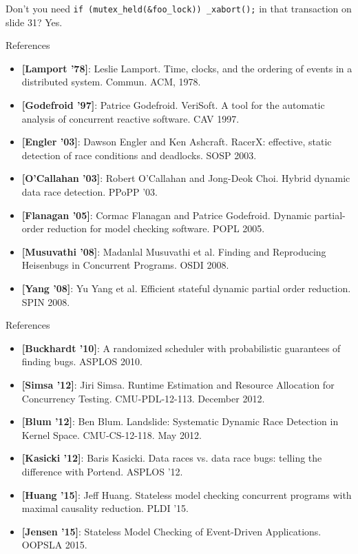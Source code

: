 \documentclass[xcolor=dvipsnames]{beamer}
\begin{document}
\begin{frame}{Don't you need \texttt{if (mutex\_held(\&foo\_lock)) \_xabort();} in that transaction on slide 31?}
	Yes.
\end{frame}

\begin{frame}{References}
	\small
	\begin{itemize}
		\item {\bf [Lamport '78]}:
			Leslie Lamport. Time, clocks, and the ordering of events in a distributed system.
			Commun. ACM, 1978.
		\item {\bf [Godefroid '97]}: Patrice Godefroid.
			VeriSoft. A tool for the automatic analysis of concurrent reactive software. CAV 1997.
		\item {\bf [Engler '03]}: Dawson Engler and Ken Ashcraft.
			RacerX: effective, static detection of race conditions and deadlocks. SOSP 2003.
		\item {\bf [O'Callahan '03]}: Robert O'Callahan and Jong-Deok Choi.
			Hybrid dynamic data race detection. PPoPP '03.
		\item {\bf [Flanagan '05]}: Cormac Flanagan and Patrice Godefroid. Dynamic partial-order reduction for
			model checking software. POPL 2005.
		\item {\bf [Musuvathi '08]}: Madanlal Musuvathi et al. Finding and Reproducing Heisenbugs in Concurrent
			Programs. OSDI 2008.
		\item {\bf [Yang '08]}: Yu Yang et al. Efficient stateful dynamic partial order reduction. SPIN 2008.
	\end{itemize}
\end{frame}
\begin{frame}{References}
	\small
	\begin{itemize}
		\item {\bf [Buckhardt '10]}: A randomized scheduler with probabilistic guarantees of finding bugs. ASPLOS 2010.
		\item {\bf [Simsa '12]}: Jiri Simsa. Runtime Estimation and Resource Allocation for
			Concurrency Testing. CMU-PDL-12-113. December 2012.
		\item {\bf [Blum '12]}: Ben Blum. Landslide: Systematic Dynamic Race Detection in Kernel
			Space. CMU-CS-12-118. May 2012.
		\item {\bf [Kasicki '12]}: Baris Kasicki. Data races vs. data race bugs: telling the difference with Portend. ASPLOS '12.
		\item {\bf [Huang '15]}: Jeff Huang. Stateless model checking concurrent programs with maximal causality reduction. PLDI '15.
		\item {\bf [Jensen '15]}: Stateless Model Checking of Event-Driven Applications. OOPSLA 2015.
	\end{itemize}
\end{frame}
\end{document}
